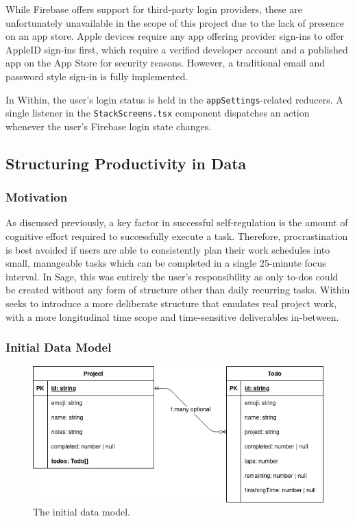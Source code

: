 While Firebase offers support for third-party login providers, these are unfortunately unavailable in the scope of this project due to the lack of presence on an app store. Apple devices require any app offering provider sign-ins to offer AppleID sign-ins first, which require a verified developer account and a published app on the App Store for security reasons. However, a traditional email and password style sign-in is fully implemented.

In Within, the user's login status is held in the \texttt{appSettings}-related reducers. A single listener in the \texttt{StackScreens.tsx} component dispatches an action whenever the user's Firebase login state changes.


\subsection{Structuring Productivity in Data}
\subsubsection{Motivation}
As discussed previously, a key factor in successful self-regulation is the amount of cognitive effort required to successfully execute a task. Therefore, procrastination is best avoided if users are able to consistently plan their work schedules into small, manageable tasks which can be completed in a single 25-minute focus interval. In Sage, this was entirely the user's responsibility as only to-dos could be created without any form of structure other than daily recurring tasks. Within seeks to introduce a more deliberate structure that emulates real project work, with a more longitudinal time scope and time-sensitive deliverables in-between.

\subsubsection{Initial Data Model}
\begin{figure}[h]
    \begin{center}
        \includegraphics[scale=0.5]{images/initial_data_model.png}
    \end{center}
    \caption{The initial data model.}
    \label{fig:initial_data_model}
\end{figure}

